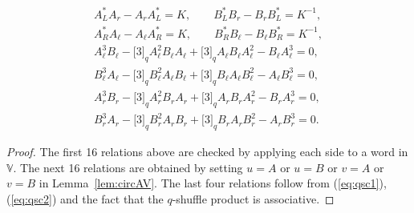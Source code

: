 \begin{Proposition}
\begin{gather*}
A^*_L A_r - A_r A^*_L = K,\qquad B^*_L B_r - B_r B^*_L = K^{-1},\\
A^*_R A_\ell - A_\ell A^*_R = K,\qquad B^*_R B_\ell - B_\ell B^*_R = K^{-1},\\
A_\ell^3 B_\ell- \lbrack 3 \rbrack_q A_\ell^2 B_\ell A_\ell+
\lbrack 3 \rbrack_q A_\ell B_\ell A^2_\ell-B_\ell A^3_\ell = 0,\\
B_\ell^3 A_\ell-\lbrack 3 \rbrack_q B_\ell^2 A_\ell B_\ell+
\lbrack 3 \rbrack_q B_\ell A_\ell B^2_\ell-A_\ell B^3_\ell = 0,\\
A_r^3 B_r-\lbrack 3 \rbrack_q A_r^2 B_r A_r+\lbrack 3 \rbrack_q A_r B_r A^2_r-B_r A^3_r = 0,\\
B_r^3 A_r-\lbrack 3 \rbrack_q B_r^2 A_r B_r+\lbrack 3 \rbrack_q B_r A_r B^2_r-A_r B^3_r = 0.
\end{gather*}
\end{Proposition}
\begin{proof}The first 16 relations above are checked by applying each side to a word in $\mathbb V$. The next 16 relations are obtained by setting $u=A$ or $u=B$ or $v=A$ or $v=B$ in Lemma~\ref{lem:circAV}. The last four relations follow from (\ref{eq:qsc1}), (\ref{eq:qsc2}) and the fact that the $q$-shuffle product
is associative.
\end{proof}

